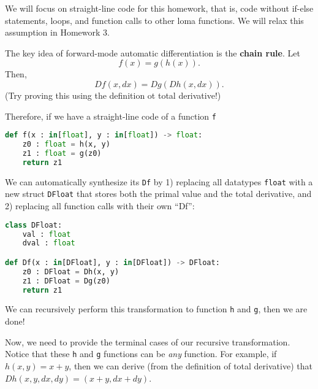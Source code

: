 We will focus on straight-line code for this homework, that is, code without if-else statements, loops, and function calls to other loma functions. We will relax this assumption in Homework 3. 

The key idea of forward-mode automatic differentiation is the \textbf{chain rule}. Let
\begin{equation}
	f(x) = g(h(x)).
\end{equation}
Then,
\begin{equation}
	Df(x, dx) = Dg(Dh(x, dx)).
\end{equation}
(Try proving this using the definition ot total derivative!)

Therefore, if we have a straight-line code of a function \lstinline{f}
\begin{lstlisting}[language=Python]
def f(x : in[float], y : in[float]) -> float:
	z0 : float = h(x, y)
	z1 : float = g(z0)
	return z1
\end{lstlisting}
We can automatically synthesize its \lstinline{Df} by 1) replacing all datatypes \lstinline{float} with a new struct \lstinline{DFloat} that stores both the primal value and the total derivative, and 2) replacing all function calls with their own ``Df'':
\begin{lstlisting}[language=Python]
class DFloat:
	val : float
	dval : float

def Df(x : in[DFloat], y : in[DFloat]) -> DFloat:
	z0 : DFloat = Dh(x, y)
	z1 : DFloat = Dg(z0)
	return z1
\end{lstlisting}
We can recursively perform this transformation to function \lstinline{h} and \lstinline{g}, then we are done!

Now, we need to provide the terminal cases of our recursive transformation. Notice that these \lstinline{h} and \lstinline{g} functions can be \emph{any} function. For example, if $h(x, y) = x + y$, then we can derive (from the definition of total derivative) that $Dh(x, y, dx, dy) = (x + y, dx + dy)$. 

